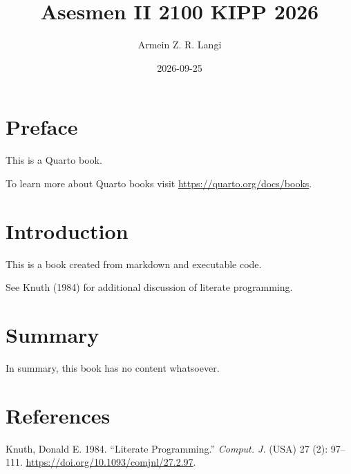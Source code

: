 \documentclass[
  letterpaper,
  DIV=11,
  numbers=noendperiod]{scrreprt}
\title{Asesmen II 2100 KIPP 2026}
\author{Armein Z. R. Langi}
\date{2026-09-25}
\newlength{\cslhangindent}
\newenvironment{CSLReferences}[2] %
 {\begin{list}{}{%
  \setlength{\itemindent}{0pt}
  \setlength{\leftmargin}{0pt}
  \setlength{\parsep}{0pt}
  \ifodd #1
   \setlength{\leftmargin}{\cslhangindent}
   \setlength{\itemindent}{-1\cslhangindent}
  \fi
  \setlength{\itemsep}{#2\baselineskip}}}
 {\end{list}}
\renewcommand*\contentsname{Table of contents}
\newcommand\contentsname{Table of contents}
\begin{document}
\maketitle

\renewcommand*\contentsname{Table of contents}
{
\setcounter{tocdepth}{2}
\tableofcontents
}


\chapter*{Preface}\label{preface}


This is a Quarto book.

To learn more about Quarto books visit
\url{https://quarto.org/docs/books}.


\chapter{Introduction}\label{introduction}

This is a book created from markdown and executable code.

See Knuth (1984) for additional discussion of literate programming.


\chapter{Summary}\label{summary}

In summary, this book has no content whatsoever.


\chapter*{References}\label{references}


\protect{}\label{refs}
\begin{CSLReferences}{1}{1}
Knuth, Donald E. 1984. {``Literate Programming.''} \emph{Comput. J.}
(USA) 27 (2): 97--111. \url{https://doi.org/10.1093/comjnl/27.2.97}.

\end{CSLReferences}
\end{document}
